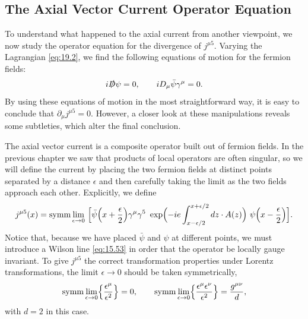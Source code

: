 \subsection{The Axial Vector Current Operator Equation}

To understand what happened to the axial current from another viewpoint, we
now study the operator equation for the divergence of $j^{\mu 5}$.  Varying
the Lagrangian \eqref{eq:19.2}, we find the following equations of motion for
the fermion fields:
\begin{equation}
  i\slashed{D}\psi = 0,\qquad iD_\mu\bar{\psi}\gamma^\mu = 0 .
  \label{eq:19.21}
\end{equation}
By using these equations of motion in the most straightforward way, it is easy
to conclude that $\partial_\mu j^{\mu 5} = 0$.  However, a closer look at
these manipulations reveals some subtleties, which alter the final conclusion.

The axial vector current is a composite operator built out of fermion
fields.  In the previous chapter we saw that products of local operators are
often singular, so we will define the current by placing the two fermion
fields at distinct points separated by a distance $\epsilon$ and then carefully
taking the limit as the two fields approach each other.  Explicitly, we define
\begin{equation}
  j^{\mu 5}(x) = \mathrm{symm}\lim_{\epsilon\to 0}\ \Bigl[
    \bar{\psi}\Bigl( x + \frac{\epsilon}{2} \Bigr)\gamma^\mu\gamma^5\
    \exp\Bigl( -ie\int_{x-\epsilon/2}^{x+\epsilon/2} dz\cdot A(z) \Bigr)\
    \psi\Bigl( x - \frac{\epsilon}{2} \Bigr) \Bigr] .
  \label{eq:19.22}
\end{equation}
Notice that, because we have placed $\bar{\psi}$ and $\psi$ at different
points, we must introduce a Wilson line \eqref{eq:15.53} in order that the
operator be locally gauge invariant.  To give $j^{\mu 5}$ the correct
transformation properties under Lorentz transformations, the limit
$\epsilon\to 0$ should be taken symmetrically,
\begin{equation}
  \mathrm{symm}\lim_{\epsilon\to 0}\Bigl\{ \frac{\epsilon^\mu}{\epsilon^2}
    \Bigr\} = 0,\qquad
  \mathrm{symm}\lim_{\epsilon\to 0}\Bigl\{ \frac{\epsilon^\mu\epsilon^\nu}
    {\epsilon^2} \Bigr\} = \frac{g^{\mu\nu}}{d} ,
  \label{eq:19.23}
\end{equation}
with $d = 2$ in this case.

